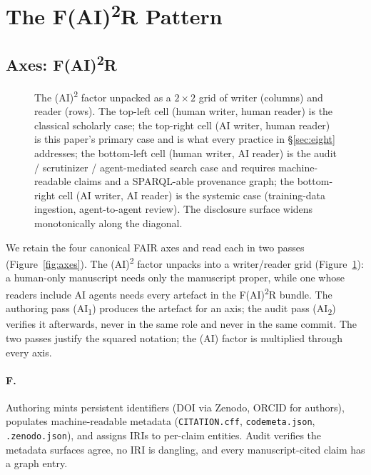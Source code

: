 \section{The F(AI)\texorpdfstring{\textsuperscript{2}}{2}R Pattern}
\label{sec:pattern}

\subsection{Axes: F(AI)\texorpdfstring{\textsuperscript{2}}{2}R}
\label{sec:axes}



\begin{figure}[!t]
\centering

\caption{The (AI)\textsuperscript{2} factor unpacked as a
$2\times 2$ grid of writer (columns) and reader (rows). The
top-left cell (human writer, human reader) is the classical
scholarly case; the top-right cell (AI writer, human reader)
is this paper's primary case and is what every practice in
\S\ref{sec:eight} addresses; the bottom-left cell (human
writer, AI reader) is the audit / scrutinizer / agent-mediated
search case and requires machine-readable claims and a
SPARQL-able provenance graph; the bottom-right cell (AI writer,
AI reader) is the systemic case (training-data ingestion,
agent-to-agent review). The disclosure surface widens
monotonically along the diagonal.}
\label{fig:ai-squared-grid}
\end{figure}

We retain the four canonical FAIR axes and read each in two passes
(Figure~\ref{fig:axes}). The (AI)\textsuperscript{2} factor unpacks
into a writer/reader grid (Figure~\ref{fig:ai-squared-grid}): a
human-only manuscript needs only the manuscript proper, while one
whose readers include AI agents needs every artefact in the
F(AI)\textsuperscript{2}R bundle. The authoring pass
(AI\textsubscript{1}) produces the artefact for an axis; the audit
pass (AI\textsubscript{2}) verifies it afterwards, never in the
same role and never in the same commit. The two passes justify the
squared notation; the (AI) factor is multiplied through every axis.

\paragraph{F.}
Authoring mints persistent identifiers (DOI via Zenodo, ORCID for
authors), populates machine-readable metadata
(\texttt{CITATION.cff}, \texttt{codemeta.json},
\texttt{.zenodo.json}), and assigns IRIs to per-claim entities. Audit
verifies the metadata surfaces agree, no IRI is dangling, and every
manuscript-cited claim has a graph entry.

